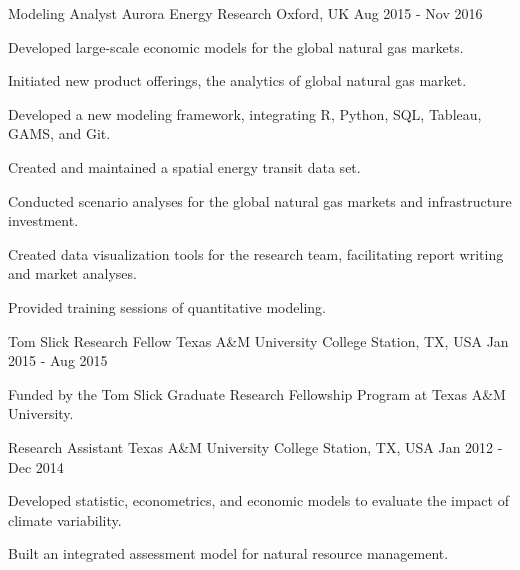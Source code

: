 \begin{cventries}
    \cventry
    {Modeling Analyst} %
    {Aurora Energy Research} %
    {Oxford, UK} %
    {Aug 2015 - Nov 2016} %
    {
        \begin{cvitems} %
            \item {Developed large-scale economic models for the global natural gas markets.}
            \item {Initiated new product offerings, the analytics of global natural gas market.}
            \item {Developed a new modeling framework, integrating R, Python, SQL, Tableau, GAMS, and Git.}
            \item {Created and maintained a spatial energy transit data set.}
            \item {Conducted scenario analyses for the global natural gas markets and infrastructure investment.}
            \item {Created data visualization tools for the research team, facilitating report writing and market analyses.}
            \item {Provided training sessions of quantitative modeling.}
        \end{cvitems}
    }

    \cventry
    {Tom Slick Research Fellow} %
    {Texas A\&M University} %
    {College Station, TX, USA} %
    {Jan 2015 - Aug 2015} %
    {
        \begin{cvitems} %
            \item {Funded by the Tom Slick Graduate Research Fellowship Program at Texas A\&M University.}
        \end{cvitems}
    }

    \cventry
    {Research Assistant} %
    {Texas A\&M University} %
    {College Station, TX, USA} %
    {Jan 2012 - Dec 2014} %
    {
        \begin{cvitems} %
            \item {Developed statistic, econometrics, and economic models to evaluate the impact of climate variability.}
            \item {Built an integrated assessment model for natural resource management.}
        \end{cvitems}
    }


\end{cventries}
